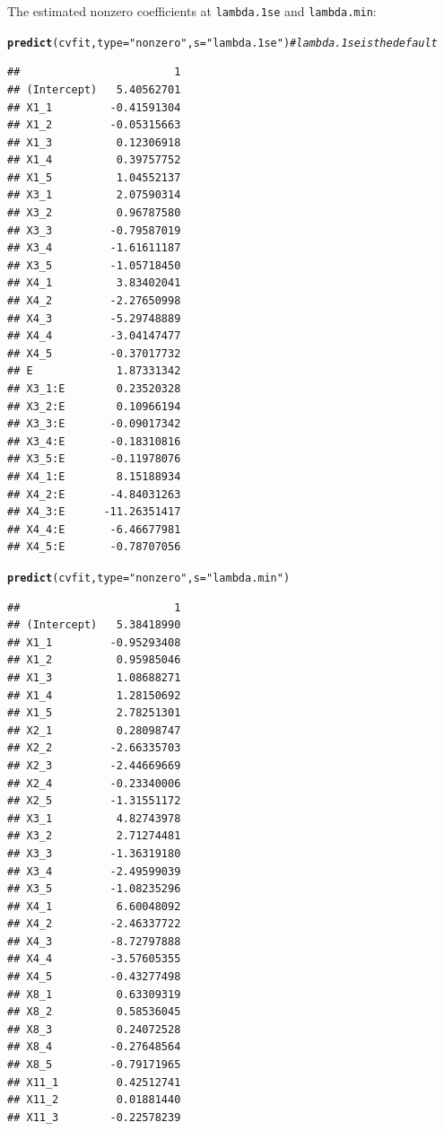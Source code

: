 \documentclass[12pt,letter]{article}\usepackage[]{graphicx}\usepackage[]{color}
\makeatletter
\newcommand{\hlstr}[1]{\textcolor[rgb]{0.192,0.494,0.8}{#1}}%
\newcommand{\hlcom}[1]{\textcolor[rgb]{0.678,0.584,0.686}{\textit{#1}}}%
\newcommand{\hlstd}[1]{\textcolor[rgb]{0.345,0.345,0.345}{#1}}%
\newcommand{\hlkwc}[1]{\textcolor[rgb]{0.333,0.667,0.333}{#1}}%
\newcommand{\hlkwd}[1]{\textcolor[rgb]{0.737,0.353,0.396}{\textbf{#1}}}%
\newenvironment{kframe}{%
 \def\at@end@of@kframe{}%
 \ifinner\ifhmode%
  \def\at@end@of@kframe{\end{minipage}}%
  \begin{minipage}{\columnwidth}%
 \fi\fi%
 \def\FrameCommand##1{\hskip\@totalleftmargin \hskip-\fboxsep
 \colorbox{shadecolor}{##1}\hskip-\fboxsep
     \hskip-\linewidth \hskip-\@totalleftmargin \hskip\columnwidth}%
 \MakeFramed {\advance\hsize-\width
   \@totalleftmargin\z@ \linewidth\hsize
   \@setminipage}}%
 {\par\unskip\endMakeFramed%
 \at@end@of@kframe}
\newenvironment{knitrout}{}{} %
\makeatother
\begin{document}
The estimated nonzero coefficients at \texttt{lambda.1se} and \texttt{lambda.min}:

\begin{knitrout}\scriptsize
{}\color{fgcolor}\begin{kframe}
\begin{alltt}
\hlkwd{predict}\hlstd{(cvfit,} \hlkwc{type} \hlstd{=} \hlstr{"nonzero"}\hlstd{,} \hlkwc{s}\hlstd{=}\hlstr{"lambda.1se"}\hlstd{)} \hlcom{# lambda.1se is the default}
\end{alltt}
\begin{verbatim}
##                        1
## (Intercept)   5.40562701
## X1_1         -0.41591304
## X1_2         -0.05315663
## X1_3          0.12306918
## X1_4          0.39757752
## X1_5          1.04552137
## X3_1          2.07590314
## X3_2          0.96787580
## X3_3         -0.79587019
## X3_4         -1.61611187
## X3_5         -1.05718450
## X4_1          3.83402041
## X4_2         -2.27650998
## X4_3         -5.29748889
## X4_4         -3.04147477
## X4_5         -0.37017732
## E             1.87331342
## X3_1:E        0.23520328
## X3_2:E        0.10966194
## X3_3:E       -0.09017342
## X3_4:E       -0.18310816
## X3_5:E       -0.11978076
## X4_1:E        8.15188934
## X4_2:E       -4.84031263
## X4_3:E      -11.26351417
## X4_4:E       -6.46677981
## X4_5:E       -0.78707056
\end{verbatim}
\begin{alltt}
\hlkwd{predict}\hlstd{(cvfit,} \hlkwc{type} \hlstd{=} \hlstr{"nonzero"}\hlstd{,} \hlkwc{s} \hlstd{=} \hlstr{"lambda.min"}\hlstd{)}
\end{alltt}
\begin{verbatim}
##                        1
## (Intercept)   5.38418990
## X1_1         -0.95293408
## X1_2          0.95985046
## X1_3          1.08688271
## X1_4          1.28150692
## X1_5          2.78251301
## X2_1          0.28098747
## X2_2         -2.66335703
## X2_3         -2.44669669
## X2_4         -0.23340006
## X2_5         -1.31551172
## X3_1          4.82743978
## X3_2          2.71274481
## X3_3         -1.36319180
## X3_4         -2.49599039
## X3_5         -1.08235296
## X4_1          6.60048092
## X4_2         -2.46337722
## X4_3         -8.72797888
## X4_4         -3.57605355
## X4_5         -0.43277498
## X8_1          0.63309319
## X8_2          0.58536045
## X8_3          0.24072528
## X8_4         -0.27648564
## X8_5         -0.79171965
## X11_1         0.42512741
## X11_2         0.01881440
## X11_3        -0.22578239

\end{verbatim}
\end{kframe}
\end{knitrout}
\end{document}
